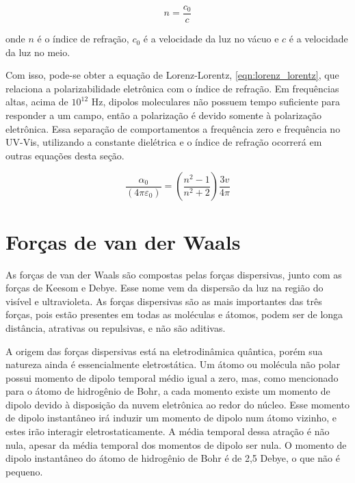 	\begin{equation}
		n = \dfrac{c_0}{c}
		\label{eqn:def_n}
	\end{equation} 
	
	\noindent onde \(n\) é o índice de refração, \(c_0\) é a velocidade da luz no vácuo e \(c\) é a velocidade da luz no meio.
	
	Com isso, pode-se obter a equação de Lorenz-Lorentz, \autoref{eqn:lorenz_lorentz},\cite{Israelachvili2011} que relaciona a polarizabilidade eletrônica com o índice de refração. Em frequências altas, acima de \(10^{12}\) Hz, dipolos moleculares não possuem tempo suficiente para responder a um campo, então a polarização é devido somente à polarização eletrônica. Essa separação de comportamentos a frequência zero e frequência no UV-Vis, utilizando a constante dielétrica e o índice de refração ocorrerá em outras equações desta seção.
	
	\begin{equation}
		\dfrac { \alpha _ { 0 } } { \left( 4 \pi \varepsilon _ { 0 } \right) } = \left( \dfrac { n ^ { 2 } - 1 } { n ^ { 2 } + 2 } \right) \dfrac { 3 v } { 4 \pi }
		\label{eqn:lorenz_lorentz}
	\end{equation}  

	\section{Forças de van der Waals}  
	
	As forças de van der Waals são compostas pelas forças dispersivas, junto com as forças de Keesom e Debye. Esse nome vem da dispersão da luz na região do visível e ultravioleta. As forças dispersivas são as mais importantes das três forças, pois estão presentes em todas as moléculas e átomos, podem ser de longa distância, atrativas ou repulsivas, e não são aditivas.
	
	A origem das forças dispersivas está na eletrodinâmica quântica, porém sua natureza ainda é essencialmente eletrostática. Um átomo ou molécula não polar possui momento de dipolo temporal médio igual a zero, mas, como mencionado para o átomo de hidrogênio de Bohr, a cada momento existe um momento de dipolo devido à disposição da nuvem eletrônica ao redor do núcleo. Esse momento de dipolo instantâneo irá induzir um momento de dipolo num átomo vizinho, e estes irão interagir eletrostaticamente. A média temporal dessa atração é não nula, apesar da média temporal dos momentos de dipolo ser nula. O momento de dipolo instantâneo do átomo de hidrogênio de Bohr é de 2,5 Debye, o que não é pequeno.
	
